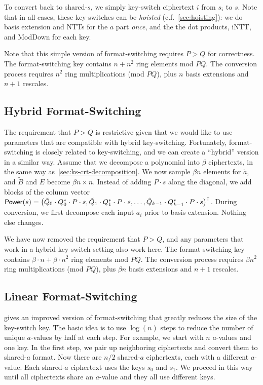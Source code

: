 \documentclass[../fheimpl.tex]{subfiles}
\begin{document}
To convert back to shared-$s$, we simply key-switch ciphertext $i$ from $s_i$ to $s$. Note that in all cases, these key-switches can be \emph{hoisted} (c.f.~\cref{sec:hoisting}): we do basis extension and NTTs for the $a$ part \emph{once}, and the the dot products, iNTT, and ModDown for each key.

Note that this simple version of format-switching requires $P > Q$ for correctness. The format-switching key contains $n + n^2$ ring elements mod $PQ$. The conversion process requires $n^2$ ring multiplications (mod $PQ$), plus $n$ basis extensions and $n+1$ rescales.

\subsection{Hybrid Format-Switching}
The requirement that $P>Q$ is restrictive given that we would like to use parameters that are compatible with hybrid key-switching. Fortunately, format-switching is closely related to key-switching, and we can create a ``hybrid'' version in a similar way. Assume that we decompose a polynomial into $\beta$ ciphertexts, in the same way as~\cref{sec:ks-crt-decomposition}. We now sample $\beta n$ elements for $\tilde{a}$, and $\tilde{B}$ and $E$ become $\beta n\times n$. Instead of adding $P\cdot s$ along the diagonal, we add blocks of the column vector $\mathsf{Power}(s)=\parens*{ \tilde{Q}_0\cdot Q_0^*\cdot P\cdot s, \tilde{Q}_1\cdot Q_1^*\cdot P\cdot s, \ldots, \tilde{Q}_{k-1}\cdot Q_{k-1}^*\cdot P\cdot s}^\intercal$. During conversion, we first decompose each input $a_i$ prior to basis extension. Nothing else changes.

We have now removed the requirement that $P>Q$, and any parameters that work in a hybrid key-switch setting also work here. The format-switching key contains $\beta \cdot n + \beta \cdot n^2$ ring elements mod $PQ$. The conversion process requires $\beta n^2$ ring multiplications (mod $PQ$), plus $\beta n$ basis extensions and $n+1$ rescales.

\subsection{Linear Format-Switching}
\cite{cryptoeprint:2024/1284} gives an improved version of format-switching that greatly reduces the size of the key-switch key. The basic idea is to use $\log(n)$ steps to reduce the number of unique $a$-values by half at each step. For example, we start with $n$ $a$-values and one key. In the first step, we pair up neighboring ciphertexts and convert them to shared-$a$ format. Now there are $n/2$ shared-$a$ ciphertexts, each with a different $a$-value. Each shared-$a$ ciphertext uses the keys $s_0$ and $s_1$. We proceed in this way until all ciphertexts share an $a$-value and they all use different keys.
\end{document}
